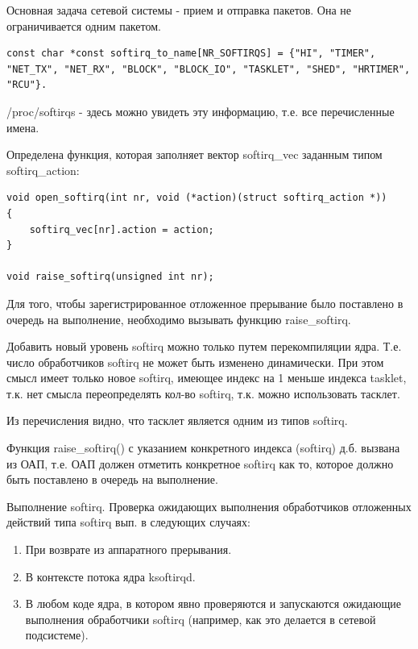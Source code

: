 \documentclass[12pt,a4paper]{scrreprt}
\begin{document}

Основная задача сетевой системы - прием и отправка пакетов. Она не ограничивается одним пакетом.

\begin{lstlisting}
const char *const softirq_to_name[NR_SOFTIRQS] = {"HI", "TIMER", "NET_TX", "NET_RX", "BLOCK", "BLOCK_IO", "TASKLET", "SHED", "HRTIMER", "RCU"}.
\end{lstlisting}	

/proc/softirqs - здесь можно увидеть эту информацию, т.е. все перечисленные имена.

Определена функция, которая заполняет вектор softirq\_vec заданным типом softirq\_action:

\begin{lstlisting}
void open_softirq(int nr, void (*action)(struct softirq_action *))
{
	softirq_vec[nr].action = action;
}

void raise_softirq(unsigned int nr);
\end{lstlisting}

Для того, чтобы зарегистрированное отложенное прерывание было поставлено в очередь на выполнение, необходимо вызывать функцию raise\_softirq.

Добавить новый уровень softirq можно только путем перекомпиляции ядра. Т.е. число обработчиков softirq не может быть изменено динамически. При этом смысл имеет только новое softirq, имеющее индекс на 1 меньше индекса tasklet, т.к. нет смысла переопределять кол-во softirq, т.к. можно использовать тасклет.

Из перечисления видно, что тасклет является одним из типов softirq.

Функция raise\_softirq() с указанием конкретного индекса (softirq) д.б. вызвана из
ОАП, т.е. ОАП должен отметить конкретное softirq как то, которое должно быть поставлено
в очередь на выполнение.

Выполнение softirq. Проверка ожидающих выполнения обработчиков отложенных действий типа softirq вып. в следующих случаях:

\begin{enumerate}
	\item При возврате из аппаратного прерывания.
	\item В контексте потока ядра ksoftirqd.
	\item В любом коде ядра, в котором явно проверяются и запускаются ожидающие выполнения
	обработчики softirq (например, как это делается в сетевой подсистеме).
\end{enumerate}
\end{document}
